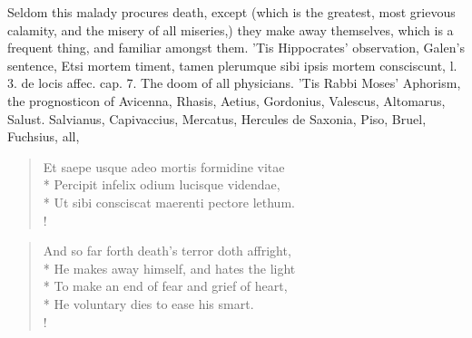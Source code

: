 Seldom this malady procures death, except (which is the greatest,
most grievous calamity, and the misery of all miseries,) they make away
themselves, which is a frequent thing, and familiar amongst them. 'Tis
Hippocrates' observation, Galen's sentence, Etsi mortem timent,
tamen plerumque sibi ipsis mortem consciscunt, l. 3. de locis affec.
cap. 7. The doom of all physicians. 'Tis Rabbi Moses' Aphorism,
the prognosticon of Avicenna, Rhasis, Aetius, Gordonius, Valescus,
Altomarus, Salust. Salvianus, Capivaccius, Mercatus, Hercules de
Saxonia, Piso, Bruel, Fuchsius, all, \etc{}

\begin{latin}%
\begin{verse}%
Et saepe usque adeo mortis formidine vitae\\*
Percipit infelix odium lucisque videndae,\\*
Ut sibi consciscat maerenti pectore lethum.\\!
\end{verse}%
\end{latin}%
\translationrule%
\begin{verse}%
And so far forth death's terror doth affright,\\*
He makes away himself, and hates the light\\*
To make an end of fear and grief of heart,\\*
He voluntary dies to ease his smart.\\!
\end{verse}%
%

